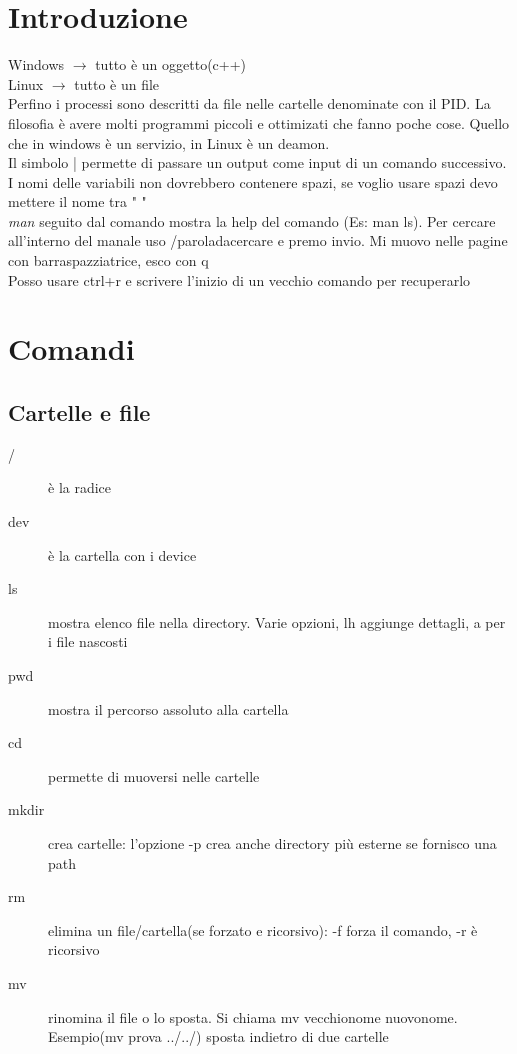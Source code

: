 \chapter{Introduzione}
Windows $\longrightarrow$ tutto è un oggetto(c++)\\
Linux $\longrightarrow$ tutto è un file\\
Perfino i processi sono descritti da file nelle cartelle denominate con il PID.
La filosofia è avere molti programmi piccoli e ottimizati che fanno poche cose. Quello che in windows è un servizio, in Linux è un deamon.\\
Il simbolo | permette di passare un output come input di un comando successivo.\\
I nomi delle variabili non dovrebbero contenere spazi, se voglio usare spazi devo mettere il nome tra " "\\

\textit{man} seguito dal comando mostra la help del comando (Es: man ls).
Per cercare all'interno del manale uso /paroladacercare e premo invio. Mi muovo nelle pagine con barraspazziatrice, esco con q\\

Posso usare ctrl+r e scrivere l'inizio di un vecchio comando per recuperarlo\\


\chapter{Comandi}
\section{Cartelle e file}
\begin{description}
\item [/] è la radice\\
\item [dev] è la cartella con i device\\
\item [ls] mostra elenco file nella directory. Varie opzioni, lh aggiunge dettagli, a per i file nascosti\\
\item [pwd] mostra il percorso assoluto alla cartella\\
\item [cd] permette di muoversi nelle cartelle\\
\item [mkdir] crea cartelle: l'opzione -p crea anche directory più esterne se fornisco una path\\
\item [rm] elimina un file/cartella(se forzato e ricorsivo): -f forza il comando, -r è ricorsivo\\
\item [mv] rinomina il file o lo sposta. Si chiama mv vecchionome nuovonome. Esempio(mv prova ../../) sposta indietro di due cartelle\\


\end{description}

